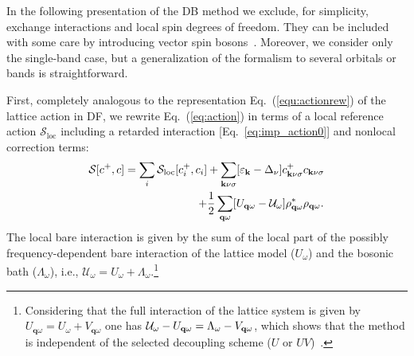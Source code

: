 \documentclass[rmp,aps,reprint,amsmath,amssymb,superscriptaddress,showpacs,nofootinbib]{revtex4-1}
\begin{document}
In the following presentation of the DB method we exclude, for simplicity, exchange interactions and local spin degrees of freedom. They can be included with some care by introducing vector spin bosons~\cite{Ayral2015}. Moreover, we consider only the single-band case, but  a generalization of the formalism to several orbitals or bands is straightforward.

First, completely analogous to the representation Eq.~(\ref{equ:actionrew}) of the lattice action in DF, we rewrite Eq.~(\ref{eq:action}) in terms of a local reference action $\mathcal{S}_{\text{loc}}$ including a retarded interaction [Eq.~\eqref{eq:imp_action0}] and nonlocal correction terms:
\begin{align}
\label{eq:actionlatt}
  \mathcal{S}[c^+,c] =\sum_{i} \mathcal{S}_{\rm loc}[c^+_i,c_i] &+ \sum_{\mathbf{k}\nu\sigma}[\varepsilon_{\mathbf{k}}-\Delta_\nu]c^+_{\mathbf{k}\nu\sigma}c_{\mathbf{k}\nu\sigma}\nonumber\\+&\frac{1}{2}\sum_{\mathbf{q}\omega}[U_{\mathbf{q}\omega}-\mathcal{U}_\omega]\rho^*_{\mathbf{q}\omega}\rho_{\mathbf{q}\omega}.
\end{align}
The local bare interaction is given by the sum of the local part of the possibly frequency-dependent bare interaction of the lattice model ($U_\omega$) and the bosonic bath ($\Lambda_\omega$), i.e., $\mathcal{U}_\omega=U_\omega+\Lambda_\omega$.\footnote{Considering that the full interaction of the lattice system is given by $U_{\mathbf{q}\omega}=U_\omega+V_{\mathbf{q}\omega}$ one has ${\cal U}_{\omega}-U_{\bf q {\omega}}=\Lambda_{\omega}-V_{\bf q {\omega}}$, which shows that the method is independent of the selected decoupling scheme ($U$ or $UV$)~\cite{vanLoon2014a}.}
\end{document}
